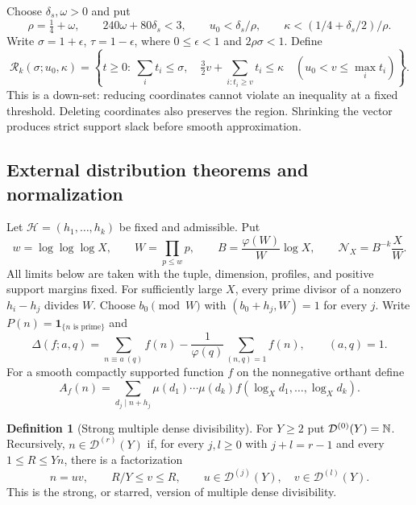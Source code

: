 \documentclass[11pt,a4paper]{article}
\theoremstyle{definition}\newtheorem{definition}[theorem]{Definition}
\theoremstyle{remark}\newtheorem{remark}[theorem]{Remark}
\newcommand{\ind}{\mathbf 1}\newcommand{\dd}{\,d}
\numberwithin{equation}{section}
\begin{document}
Choose $\delta_s,\omega>0$ and put
\begin{equation}\label{eq:arithmetic}
 \rho=\tfrac14+\omega,\qquad 240\omega+80\delta_s<3,\qquad
 u_0<\delta_s/\rho,\qquad \kappa<(1/4+\delta_s/2)/\rho.
\end{equation}
Write $\sigma=1+\epsilon$, $\tau=1-\epsilon$, where $0\le\epsilon<1$ and $2\rho\sigma<1$. Define
\begin{equation}\label{eq:region}
\mathcal R_k(\sigma;u_0,\kappa)=
\left\{t\ge0:\ \sum_i t_i\le\sigma,\quad
\tfrac32v+\sum_{i:t_i\ge v}t_i\le\kappa\quad
(u_0<v\le\max_i t_i)\right\}.
\end{equation}
This is a down-set: reducing coordinates cannot violate an inequality at a fixed threshold. Deleting coordinates also preserves the region. Shrinking the vector produces strict support slack before smooth approximation.

\subsection{External distribution theorems and normalization}
Let $\mathcal H=(h_1,\ldots,h_k)$ be fixed and admissible. Put
\[
 w=\log\log\log X,\qquad W=\prod_{p\le w}p,\qquad
 B=\frac{\varphi(W)}W\log X,\qquad \mathcal N_X=B^{-k}\frac XW.
\]
All limits below are taken with the tuple, dimension, profiles, and positive support margins fixed. For sufficiently large $X$, every prime divisor of a nonzero $h_i-h_j$ divides $W$. Choose $b_0\pmod W$ with $(b_0+h_j,W)=1$ for every $j$. Write $P(n)=\ind_{\{n\text{ is prime}\}}$ and
\[
 \Delta(f;a,q)=\sum_{n\equiv a\ (q)}f(n)
 -\frac1{\varphi(q)}\sum_{(n,q)=1}f(n),\qquad (a,q)=1.
\]
For a smooth compactly supported function $f$ on the nonnegative orthant define
\[
 A_f(n)=\sum_{d_j\mid n+h_j}\mu(d_1)\cdots\mu(d_k)
 f(\log_Xd_1,\ldots,\log_Xd_k).
\]

\begin{definition}[Strong multiple dense divisibility]\label{def:dd}
For $Y\ge2$ put $\mathcal D^{(0)}(Y)=\mathbb N$. Recursively, $n\in\mathcal D^{(r)}(Y)$ if, for every $j,l\ge0$ with $j+l=r-1$ and every $1\le R\le Yn$, there is a factorization
\[
 n=uv,\qquad R/Y\le v\le R,\qquad
 u\in\mathcal D^{(j)}(Y),\quad v\in\mathcal D^{(l)}(Y).
\]
This is the strong, or starred, version of multiple dense divisibility.
\end{definition}
\end{document}
